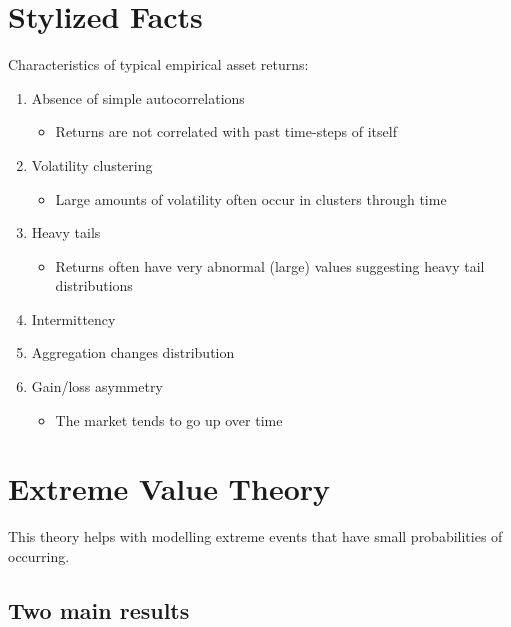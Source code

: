 \documentclass[
  oneside]{book}
\providecommand{\tightlist}{%
  \setlength{\itemsep}{0pt}\setlength{\parskip}{0pt}}
\begin{document}
\hypertarget{stylized-facts}{%
\section{Stylized Facts}\label{stylized-facts}}

Characteristics of typical empirical asset returns:

\begin{enumerate}
\def\labelenumi{\arabic{enumi}.}
\tightlist
\item
  Absence of simple autocorrelations

  \begin{itemize}
  \tightlist
  \item
    Returns are not correlated with past time-steps of itself
  \end{itemize}
\item
  Volatility clustering

  \begin{itemize}
  \tightlist
  \item
    Large amounts of volatility often occur in clusters through time
  \end{itemize}
\item
  Heavy tails

  \begin{itemize}
  \tightlist
  \item
    Returns often have very abnormal (large) values suggesting heavy tail distributions
  \end{itemize}
\item
  Intermittency
\item
  Aggregation changes distribution
\item
  Gain/loss asymmetry

  \begin{itemize}
  \tightlist
  \item
    The market tends to go up over time
  \end{itemize}
\end{enumerate}

\hypertarget{extreme-value-theory}{%
\section{Extreme Value Theory}\label{extreme-value-theory}}

This theory helps with modelling extreme events that have small probabilities of occurring.

\hypertarget{two-main-results}{%
\subsection{Two main results}\label{two-main-results}}
\end{document}
